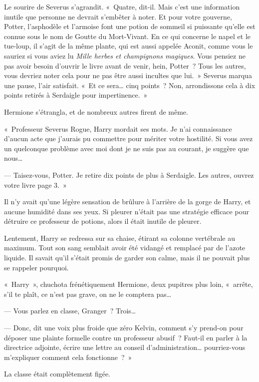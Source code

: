 Le sourire de Severus s'agrandit.
«~Quatre, dit-il.
Mais c'est une information inutile que personne ne devrait s'embêter à noter.
Et pour votre gouverne, Potter, l'asphodèle et l'armoise font une potion de sommeil si puissante qu'elle est connue sous le nom de Goutte du Mort-Vivant.
En ce qui concerne le napel et le tue-loup, il s'agit de la même plante, qui est aussi appelée Aconit, comme vous le sauriez si vous aviez lu \emph{Mille herbes et champignons magiques}.
Vous pensiez ne pas avoir besoin d'ouvrir le livre avant de venir, hein, Potter~?
Tous les autres, vous devriez noter cela pour ne pas être aussi incultes que lui.~»
Severus marqua une pause, l'air satisfait.
«~Et ce sera… cinq points~?
Non, arrondissons cela à dix points retirés à Serdaigle pour impertinence.~»

Hermione s'étrangla, et de nombreux autres firent de même.

«~Professeur Severus Rogue, Harry mordait ses mots.
Je n'ai connaissance d'aucun acte que j'aurais pu commettre pour mériter votre hostilité.
Si vous avez un quelconque problème avec moi dont je ne suis pas au courant, je suggère que nous…

--- Taisez-vous, Potter.
Je retire dix points de plus à Serdaigle.
Les autres, ouvrez votre livre page 3.~»

Il n'y avait qu'une légère sensation de brûlure à l'arrière de la gorge de Harry, et aucune humidité dans ses yeux.
Si pleurer n'était pas une stratégie efficace pour détruire ce professeur de potions, alors il était inutile de pleurer.

Lentement, Harry se redressa sur sa chaise, étirant sa colonne vertébrale au maximum.
Tout son sang semblait avoir été vidangé et remplacé par de l'azote liquide.
Il savait qu'il s'était promis de garder son calme, mais il ne pouvait plus se rappeler pourquoi.

«~Harry~», chuchota frénétiquement Hermione, deux pupitres plus loin, «~arrête, s'il te plaît, ce n'est pas grave, on ne le comptera pas…

--- Vous parlez en classe, Granger~?
Trois…

--- Donc, dit une voix plus froide que zéro Kelvin, comment s'y prend-on pour déposer une plainte formelle contre un professeur abusif~?
Faut-il en parler à la directrice adjointe, écrire une lettre au conseil d'administration… pourriez-vous m'expliquer comment cela fonctionne~?~»

La classe était complètement figée.

